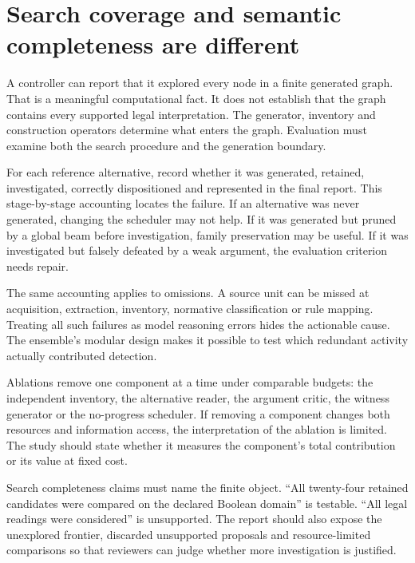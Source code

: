 \section{Search coverage and semantic completeness are different}
\label{merge:M09:10}


A controller can report that it explored every node in a finite generated graph.
That is a meaningful computational fact. It does not establish that the graph
contains every supported legal interpretation. The generator, inventory and
construction operators determine what enters the graph. Evaluation must examine
both the search procedure and the generation boundary.

For each reference alternative, record whether it was generated, retained,
investigated, correctly dispositioned and represented in the final report. This
stage-by-stage accounting locates the failure. If an alternative was never
generated, changing the scheduler may not help. If it was generated but pruned by
a global beam before investigation, family preservation may be useful. If it was
investigated but falsely defeated by a weak argument, the evaluation criterion
needs repair.


The same accounting applies to omissions. A source unit can be missed at
acquisition, extraction, inventory, normative classification or rule mapping.
Treating all such failures as model reasoning errors hides the actionable cause.
The ensemble's modular design makes it possible to test which redundant activity
actually contributed detection.

Ablations remove one component at a time under comparable budgets: the independent
inventory, the alternative reader, the argument critic, the witness generator or
the no-progress scheduler. If removing a component changes both resources and
information access, the interpretation of the ablation is limited. The study
should state whether it measures the component's total contribution or its value
at fixed cost.

Search completeness claims must name the finite object. ``All twenty-four retained
candidates were compared on the declared Boolean domain'' is testable. ``All legal
readings were considered'' is unsupported. The report should also expose the
unexplored frontier, discarded unsupported proposals and resource-limited
comparisons so that reviewers can judge whether more investigation is justified.

